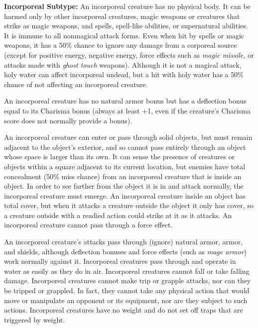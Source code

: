 \documentclass{article}
\begin{document}
\vspace{12pt}
\textbf{Incorporeal Subtype:} An incorporeal creature has no physical body. It 
can be harmed only by other incorporeal creatures, magic weapons or creatures that 
strike as magic weapons, and spells, spell-like abilities, or supernatural abilities. 
It is immune to all nonmagical attack forms. Even when hit by spells or magic weapons, 
it has a 50\% chance to ignore any damage from a corporeal source (except for positive 
energy, negative energy, force effects such as \textit{magic missile, }or attacks 
made with \textit{ghost touch }weapons). Although it is not a magical attack, holy 
water can affect incorporeal undead, but a hit with holy water has a 50\% chance 
of not affecting an incorporeal creature.

An incorporeal creature has no natural armor bonus but has a deflection bonus equal 
to its Charisma bonus (always at least +1, even if the creature's Charisma score 
does not normally provide a bonus). 

An incorporeal creature can enter or pass through solid objects, but must remain 
adjacent to the object's exterior, and so cannot pass entirely through an object 
whose space is larger than its own. It can sense the presence of creatures or objects 
within a square adjacent to its current location, but enemies have total concealment 
(50\% miss chance) from an incorporeal creature that is inside an object. In order 
to see farther from the object it is in and attack normally, the incorporeal creature 
must emerge. An incorporeal creature inside an object has total cover, but when 
it attacks a creature outside the object it only has cover, so a creature outside 
with a readied action could strike at it as it attacks. An incorporeal creature 
cannot pass through a force effect.

An incorporeal creature's attacks pass through (ignore) natural armor, armor, and 
shields, although deflection bonuses and force effects (such as \textit{mage armor}) 
work normally against it. Incorporeal creatures pass through and operate in water 
as easily as they do in air. Incorporeal creatures cannot fall or take falling 
damage. Incorporeal creatures cannot make trip or grapple attacks, nor can they 
be tripped or grappled. In fact, they cannot take any physical action that would 
move or manipulate an opponent or its equipment, nor are they subject to such actions. 
Incorporeal creatures have no weight and do not set off traps that are triggered 
by weight.
\end{document}
